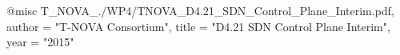 @misc{ T_NOVA_./WP4/TNOVA_D4.21_SDN_Control_Plane_Interim.pdf,
       author = "T-NOVA Consortium",
       title = "D4.21 SDN Control Plane Interim",
       year = "2015" }

